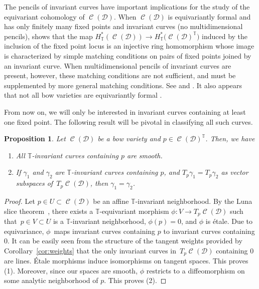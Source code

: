 \documentclass[11pt]{article}
\numberwithin{equation}{section}
\newtheorem{Proposition}[Theorem]{Proposition}
 { \theoremstyle{definition}
\newtheorem{Definition}[Theorem]{Definition}
\newtheorem{Note}[Theorem]{Note}
\newtheorem{Example}[Theorem]{Example}
\newtheorem{Remark}[Theorem]{Remark} }
\newcommand{\brane}{\mathcal D}
\newcommand{\torus}{\mathbb T}
\DeclareMathOperator{\bowvar}{\mathcal C}
\begin{document}
The pencils of invariant curves have important implications for the study of the equivariant cohomology of $\bowvar(\brane)$. When $\bowvar(\brane)$ is equivariantly formal and has only finitely many fixed points and invariant curves (no multidimensional pencils), \cite{GKM} shows that the map $H^*_\torus (\bowvar(\brane)) \to H^*_\torus \bigl(\bowvar(\brane)^\torus\bigr)$ induced by the inclusion of the fixed point locus is an injective ring homomorphism whose image is characterized by simple matching conditions on pairs of fixed points joined by an invariant curve. When multidimensional pencils of invariant curves are present, however, these matching conditions are not sufficient, and must be supplemented by more general matching conditions. See \cite{CS} and \cite[Section~7.4]{equiv_coh}. It also appears that not all bow varieties are equivariantly formal \cite{yibo}.

From now on, we will only be interested in invariant curves containing at least one fixed point. The following result will be pivotal in classifying all such curves.

\begin{Proposition} \label{prop:equiv_geo}
Let $\bowvar(\brane)$ be a bow variety and $p \in \bowvar(\brane)^\torus$. Then, we have
\begin{enumerate}\itemsep=0pt
\item[$(1)$] All $\torus$-invariant curves containing $p$ are smooth.
\item[$(2)$] If $\gamma_1$ and $\gamma_2$ are $\torus$-invariant curves containing $p$, and $T_p\gamma_1=T_p\gamma_2$ as vector subspaces of~$T_p\bowvar(\brane)$, then $\gamma_1 = \gamma_2$.
\end{enumerate}
\end{Proposition}

\begin{proof}
Let $p\in U \subset \bowvar(\brane)$ be an affine $\torus$-invariant neighborhood. By the Luna slice theorem~\cite[Appendix of Chapter~1]{MFK}, there exists a $\torus$-equivariant morphism $\phi\colon V \to T_p \bowvar(\brane)$ such that~${p \in V \subset U}$ is a $\torus$-invariant neighborhood, $\phi(p) = 0$, and $\phi$ is \'etale. Due to equivariance, $\phi$~maps invariant curves containing $p$ to invariant curves containing $0$. It can be easily seen from the structure of the tangent weights provided by Corollary~\ref{cor:weights} that the only invariant curves in~$T_p\bowvar(\brane)$ containing $0$ are lines. \'Etale morphisms induce isomorphisms on tangent spaces. This proves (1). Moreover, since our spaces are smooth, $\phi$ restricts to a diffeomorphism on some analytic neighborhood of $p$. This proves (2).
\end{proof}
\end{document}
